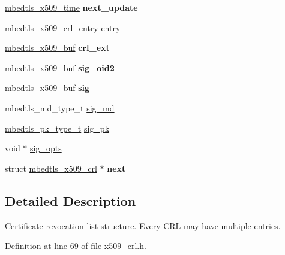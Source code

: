 \begin{DoxyCompactItemize}
\mbox{\hyperlink{structmbedtls__x509__time}{mbedtls\+\_\+x509\+\_\+time}} {\bfseries next\+\_\+update}
\item 
\mbox{\hyperlink{structmbedtls__x509__crl__entry}{mbedtls\+\_\+x509\+\_\+crl\+\_\+entry}} \mbox{\hyperlink{structmbedtls__x509__crl_a880036b1b4a2b449542f8f1fa389694f}{entry}}
\item 
\mbox{\label{structmbedtls__x509__crl_a6bed76483128f2128c0b92cba28ac118}} 
\mbox{\hyperlink{group__x509__module_ga4d02c9e8e4e2934555e0d132cd2976dc}{mbedtls\+\_\+x509\+\_\+buf}} {\bfseries crl\+\_\+ext}
\item 
\mbox{\label{structmbedtls__x509__crl_ac2c9b5655e5dfaabd3d285e8e0b4b34b}} 
\mbox{\hyperlink{group__x509__module_ga4d02c9e8e4e2934555e0d132cd2976dc}{mbedtls\+\_\+x509\+\_\+buf}} {\bfseries sig\+\_\+oid2}
\item 
\mbox{\label{structmbedtls__x509__crl_a91614cb3497ac7220394c04014cf0f2d}} 
\mbox{\hyperlink{group__x509__module_ga4d02c9e8e4e2934555e0d132cd2976dc}{mbedtls\+\_\+x509\+\_\+buf}} {\bfseries sig}
\item 
mbedtls\+\_\+md\+\_\+type\+\_\+t \mbox{\hyperlink{structmbedtls__x509__crl_a85c03124f3b4a2afe8b5c47fab13a8a9}{sig\+\_\+md}}
\item 
\mbox{\hyperlink{pk_8h_a3fe41eff5605ae727eb9d28dad297020}{mbedtls\+\_\+pk\+\_\+type\+\_\+t}} \mbox{\hyperlink{structmbedtls__x509__crl_a8c94375266c53f6e73d0134dc978151a}{sig\+\_\+pk}}
\item 
void $\ast$ \mbox{\hyperlink{structmbedtls__x509__crl_ad59e3744b290f19d6400678d364aef77}{sig\+\_\+opts}}
\item 
\mbox{\label{structmbedtls__x509__crl_a6dbfb57fe2c749c3bff9f7f45aacec05}} 
struct \mbox{\hyperlink{structmbedtls__x509__crl}{mbedtls\+\_\+x509\+\_\+crl}} $\ast$ {\bfseries next}
\end{DoxyCompactItemize}


\subsection{Detailed Description}
Certificate revocation list structure. Every C\+RL may have multiple entries. 

Definition at line 69 of file x509\+\_\+crl.\+h.



